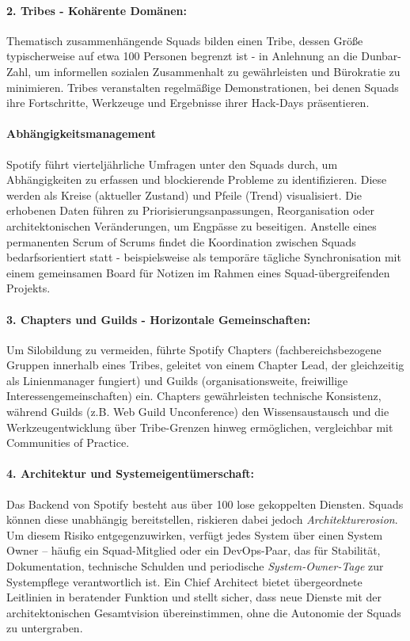 \paragraph{2. Tribes - Kohärente Domänen:}
Thematisch zusammenhängende Squads bilden einen Tribe, dessen Größe typischerweise auf etwa 100 Personen begrenzt ist - in Anlehnung an die Dunbar-Zahl,
um informellen sozialen Zusammenhalt zu gewährleisten und Bürokratie zu minimieren. Tribes veranstalten regelmäßige Demonstrationen, bei denen Squads ihre Fortschritte, Werkzeuge und Ergebnisse ihrer Hack-Days präsentieren.
\paragraph{Abhängigkeitsmanagement}
Spotify führt vierteljährliche Umfragen unter den Squads durch, um Abhängigkeiten zu erfassen und blockierende Probleme zu identifizieren. 
Diese werden als Kreise (aktueller Zustand) und Pfeile (Trend) visualisiert. Die erhobenen Daten führen zu Priorisierungsanpassungen, Reorganisation oder architektonischen Veränderungen, um Engpässe zu beseitigen. 
Anstelle eines permanenten Scrum of Scrums findet die Koordination zwischen Squads bedarfsorientiert statt - beispielsweise als temporäre tägliche Synchronisation mit einem gemeinsamen Board für Notizen im Rahmen eines Squad-übergreifenden Projekts.
\paragraph{3. Chapters und Guilds - Horizontale Gemeinschaften:}
Um Silobildung zu vermeiden, führte Spotify Chapters (fachbereichsbezogene Gruppen innerhalb eines Tribes, geleitet von einem Chapter Lead, der gleichzeitig als Linienmanager fungiert) und Guilds (organisationsweite, freiwillige Interessengemeinschaften) ein. 
Chapters gewährleisten technische Konsistenz, während Guilds (z.B. Web Guild Unconference) den Wissensaustausch und die Werkzeugentwicklung über Tribe-Grenzen hinweg ermöglichen, vergleichbar mit Communities of Practice.
\paragraph{4. Architektur und Systemeigentümerschaft:}
Das Backend von Spotify besteht aus über 100 lose gekoppelten Diensten. Squads können diese unabhängig bereitstellen, riskieren dabei jedoch \textit{Architekturerosion}. Um diesem Risiko entgegenzuwirken, verfügt jedes System über einen System Owner – häufig ein Squad-Mitglied oder ein DevOps-Paar, das für Stabilität, Dokumentation, technische Schulden und periodische \textit{System-Owner-Tage}  zur Systempflege verantwortlich ist. 
Ein Chief Architect bietet übergeordnete Leitlinien in beratender Funktion und stellt sicher, dass neue Dienste mit der architektonischen Gesamtvision übereinstimmen, ohne die Autonomie der Squads zu untergraben.
